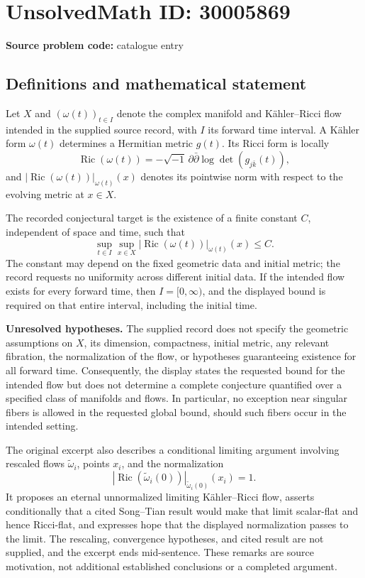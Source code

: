 \documentclass[11pt]{article}
\begin{document}
\section*{UnsolvedMath ID: 30005869}
\textbf{Source problem code:} catalogue entry
\subsection{Definitions and mathematical statement}
Let \(X\) and \((\omega(t))_{t\in I}\) denote the complex manifold and Kähler--Ricci flow intended in the supplied source record, with \(I\) its forward time interval. A Kähler form \(\omega(t)\) determines a Hermitian metric \(g(t)\). Its Ricci form is locally
\[
\operatorname{Ric}(\omega(t))=-\sqrt{-1}\,\partial\bar\partial\log\det(g_{j\bar k}(t)),
\]
and \(|\operatorname{Ric}(\omega(t))|_{\omega(t)}(x)\) denotes its pointwise norm with respect to the evolving metric at \(x\in X\).

The recorded conjectural target is the existence of a finite constant \(C\), independent of space and time, such that
\[
\sup_{t\in I}\sup_{x\in X}
|\operatorname{Ric}(\omega(t))|_{\omega(t)}(x)\le C.
\]
The constant may depend on the fixed geometric data and initial metric; the record requests no uniformity across different initial data. If the intended flow exists for every forward time, then \(I=[0,\infty)\), and the displayed bound is required on that entire interval, including the initial time.

\textbf{Unresolved hypotheses.} The supplied record does not specify the geometric assumptions on \(X\), its dimension, compactness, initial metric, any relevant fibration, the normalization of the flow, or hypotheses guaranteeing existence for all forward time. Consequently, the display states the requested bound for the intended flow but does not determine a complete conjecture quantified over a specified class of manifolds and flows. In particular, no exception near singular fibers is allowed in the requested global bound, should such fibers occur in the intended setting.

The original excerpt also describes a conditional limiting argument involving rescaled flows \(\widetilde\omega_i\), points \(x_i\), and the normalization
\[
|\operatorname{Ric}(\widetilde\omega_i(0))|_{\widetilde\omega_i(0)}(x_i)=1.
\]
It proposes an eternal unnormalized limiting Kähler--Ricci flow, asserts conditionally that a cited Song--Tian result would make that limit scalar-flat and hence Ricci-flat, and expresses hope that the displayed normalization passes to the limit. The rescaling, convergence hypotheses, and cited result are not supplied, and the excerpt ends mid-sentence. These remarks are source motivation, not additional established conclusions or a completed argument.
\end{document}
